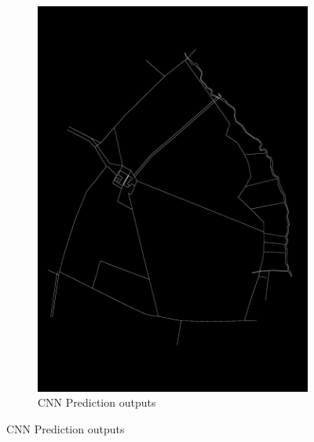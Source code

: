 \documentclass[12pt]{article}
\begin{document}
\begin{figure}[H]
\begin{subfigure}[b]{.3\textwidth}
		\includegraphics[width=1\linewidth]{images/label5.png}  
		\caption{CNN Prediction outputs}
	\end{subfigure}
	

\end{figure}
\end{document}
